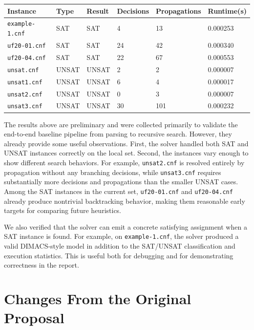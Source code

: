 \documentclass[11pt]{article}
\begin{document}
\begin{center}
\small
\renewcommand{\arraystretch}{1.1}
\begin{tabular}{|p{3.0cm}|p{1.2cm}|p{1.2cm}|p{1.5cm}|p{2.1cm}|p{2.4cm}|}
\hline
\textbf{Instance} & \textbf{Type} & \textbf{Result} & \textbf{Decisions} & \textbf{Propagations} & \textbf{Runtime(s)} \\
\hline
\texttt{example-1.cnf} & SAT & SAT & 4 & 13 & 0.000253 \\
\hline
\texttt{uf20-01.cnf} & SAT & SAT & 24 & 42 & 0.000340 \\
\hline
\texttt{uf20-04.cnf} & SAT & SAT & 22 & 67 & 0.000553 \\
\hline
\texttt{unsat.cnf} & UNSAT & UNSAT & 2 & 2 & 0.000007 \\
\hline
\texttt{unsat1.cnf} & UNSAT & UNSAT & 6 & 4 & 0.000017 \\
\hline
\texttt{unsat2.cnf} & UNSAT & UNSAT & 0 & 3 & 0.000007 \\
\hline
\texttt{unsat3.cnf} & UNSAT & UNSAT & 30 & 101 & 0.000232 \\
\hline
\end{tabular}
\end{center}

The results above are preliminary and were collected primarily to validate the end-to-end baseline
pipeline from parsing to recursive search. However, they already provide some useful observations.
First, the solver handled both SAT and UNSAT instances correctly on the local set. Second, the
instances vary enough to show different search behaviors. For example, \texttt{unsat2.cnf} is
resolved entirely by propagation without any branching decisions, while \texttt{unsat3.cnf}
requires substantially more decisions and propagations than the smaller UNSAT cases. Among the
SAT instances in the current set, \texttt{uf20-01.cnf} and \texttt{uf20-04.cnf} already produce
nontrivial backtracking behavior, making them reasonable early targets for comparing future
heuristics.

We also verified that the solver can emit a concrete satisfying assignment when a SAT instance is
found. For example, on \texttt{example-1.cnf}, the solver produced a valid DIMACS-style model in
addition to the SAT/UNSAT classification and execution statistics. This is useful both for debugging
and for demonstrating correctness in the report.

\section{Changes From the Original Proposal}
\end{document}
